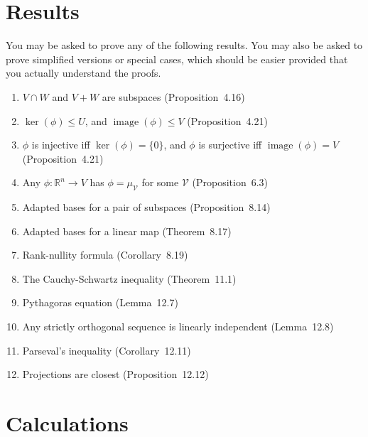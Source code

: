 \documentclass{amsart}
\newcommand{\CV}        {{\mathcal{V}}}
\newcommand{\R}         {{\mathbb{R}}}
\newcommand{\img}{\operatorname{image}}
\renewcommand{\:}{\colon}
\begin{document}
\section*{Results}
 
You may be asked to prove any of the following results.  You
may also be asked to prove simplified versions or special
cases, which should be easier provided that you actually
understand the proofs.
\begin{enumerate}
 \item $V\cap W$ and $V+W$ are subspaces (Proposition~{4.16})
 \item $\ker(\phi)\leq U$, and $\img(\phi)\leq V$
  (Proposition~{4.21})
 \item $\phi$ is injective iff $\ker(\phi)=\{0\}$, and
  $\phi$ is surjective iff $\img(\phi)=V$ (Proposition~{4.21})
 \item Any $\phi\:\R^n\to V$ has $\phi=\mu_\CV$ for some
  $\CV$ (Proposition~{6.3})
 \item Adapted bases for a pair of subspaces
  (Proposition~{8.14})
 \item Adapted bases for a linear map (Theorem~{8.17})
 \item Rank-nullity formula (Corollary~{8.19})
 \item The Cauchy-Schwartz inequality (Theorem~{11.1})
 \item Pythagoras equation (Lemma~{12.7})
 \item Any strictly orthogonal sequence is linearly
  independent (Lemma~{12.8})
 \item Parseval's inequality (Corollary~{12.11})
 \item Projections are closest (Proposition~{12.12})
\end{enumerate}
\vspace{4ex}
 
\section*{Calculations}
\end{document}
